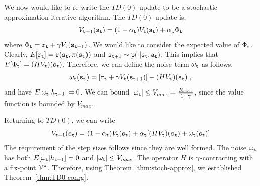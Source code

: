 
We now would like to re-write the $TD(0)$ update to be a stochastic
approximation iterative algorithm. The $TD(0)$ update is,
\[
V_{{\tt t}+1}({\tt s}_{\tt t})=(1-\alpha_{\tt t})V_{\tt t}({\tt s}_{\tt t})+\alpha_{\tt t}
\Phi_{\tt t}
\]
where $\Phi_{\tt t}={\tt r}_{\tt t}+\gamma
V_{\tt t}({\tt s}_{{\tt t}+1})$. We would like to consider the expected
value of $\Phi_{\tt t}$. Clearly,
$E[{\tt r}_{\tt t}]={\tt r}({\tt s}_{\tt t},\pi({\tt s}_{\tt t}))$
and ${\tt s}_{{\tt t}+1} \sim {\tt p}(\cdot |{\tt s}_{\tt t},{\tt a}_{\tt t})$.
This implies that $E[\Phi_{\tt t}]=(HV_{\tt t})({\tt s}_{\tt t})$.
Therefore, we can define the noise term $\omega_{\tt t}$ as follows,
\[
\omega_{\tt t}({\tt s}_{\tt t})=[{\tt r}_{\tt t}+\gamma
V_{\tt t}({\tt s}_{{\tt t}+1})]-(HV_{\tt t})({\tt s}_{\tt t})\;,
\]
and have $E[\omega_{\tt t}|h_{{\tt t}-1}]=0$. We can bound $|\omega_{\tt t}|\leq
V_{max}=\frac{R_{max}}{1-\gamma}$, since the value function is
bounded by $V_{max}$.

Returning to $TD(0)$, we can write
\[
V_{{\tt t}+1}({\tt s}_{\tt t})=(1-\alpha_{\tt t})V_{\tt t}({\tt s}_{\tt t})+\alpha_{\tt t}
[(HV_{\tt t})({\tt s}_{\tt t})+\omega_{\tt t}({\tt s}_{\tt t})]
\]
The requirement of the step sizes follows since they are well formed. The noise $\omega_{\tt t}$ has both
$E[\omega_{\tt t}|h_{{\tt t}-1}]=0$ and $|\omega_{\tt t}|\leq V_{max}$. The
operator $H$ is $\gamma$-contracting with a fix-point $\mathcal{V}^\pi$.
Therefore, using Theorem~\ref{thm:stoch-approx}, we established
Theorem~\ref{thm:TD0-conrg}.

